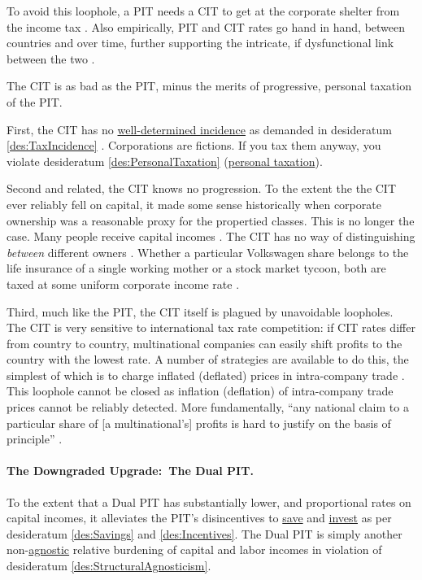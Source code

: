 To avoid this loophole, a PIT needs a CIT to get at the corporate shelter from the income tax \citep[7]{Genschel2005}.
Also empirically, PIT and CIT rates go hand in hand, between countries and over time, further supporting the intricate, if dysfunctional link between the two \citep[14]{Piatkowski2008}.

The CIT is as bad as the PIT, minus the merits of progressive, personal taxation of the PIT.

First, the CIT has no \hyperref[des:TaxIncidence]{well-determined incidence} as demanded in desideratum \ref{des:TaxIncidence} \citep[918]{McCaffery2005}.
Corporations are fictions.
If you tax them anyway, you violate desideratum \ref{des:PersonalTaxation} (\hyperref[des:PersonalTaxation]{personal taxation}).

Second and related, the CIT knows no progression.
To the extent the the CIT ever reliably fell on capital, it made some sense historically when corporate ownership was a reasonable proxy for the propertied classes.
This is no longer the case.
Many people receive capital incomes \citep[XV]{Grabka2007a}.
The CIT has no way of distinguishing \emph{between} different owners \citep[918]{McCaffery2005}.
Whether a particular Volkswagen share belongs to the life insurance of a single working mother or a stock market tycoon, both are taxed at some uniform corporate income rate .

Third, much like the PIT, the CIT itself is plagued by unavoidable loopholes.
The CIT is very sensitive to international tax rate competition:
if CIT rates differ from country to country, multinational companies can easily shift profits to the country with the lowest rate.
A number of strategies are available to do this, the simplest of which is to charge inflated (deflated) prices in intra-company trade \citep[43ff]{Ganghof2004}.
This loophole cannot be closed as inflation (deflation) of intra-company trade prices cannot be reliably detected.
More fundamentally, ``any national claim to a particular share of [a multinational's] profits is hard to justify on the basis of principle'' \citep[61]{Genschel2005}.


\paragraph{The Downgraded Upgrade:~The Dual PIT.}  \label{sec:ScoreDualPIT} To the extent that a Dual PIT has substantially lower, and proportional rates on capital incomes, it alleviates the PIT's disincentives to \hyperref[des:Savings]{save} and \hyperref[des:Incentives]{invest} as per desideratum \ref{des:Savings} and \ref{des:Incentives}.
The Dual PIT is simply another non-\hyperref[des:StructuralAgnosticism]{agnostic} relative burdening of capital and labor incomes in violation of desideratum \ref{des:StructuralAgnosticism}.

